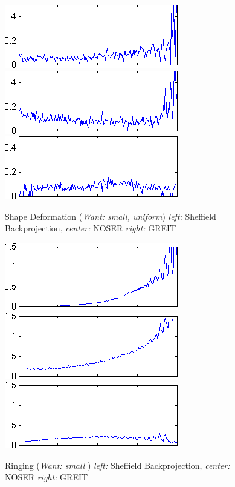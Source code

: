 \documentclass[12pt]{iopart}
\begin{document}
\begin{figure}[bhtp]
\begin{center}
  \includegraphics[width= 0.3 \textwidth]
{../../tutorial/GREIT-evaluation/simulation_test_imgs/simulation_test04_15.png}
  \includegraphics[width= 0.3 \textwidth]
{../../tutorial/GREIT-evaluation/simulation_test_imgs/simulation_test04_25.png}
  \includegraphics[width= 0.3 \textwidth]
{../../tutorial/GREIT-evaluation/simulation_test_imgs/simulation_test04_45.png}
\caption{ \label{fig:rimage}
Shape Deformation ({\em Want: small, uniform})
{\em left:} Sheffield Backprojection,
{\em center:} NOSER
{\em right:} GREIT
}
\end{center}
\end{figure}

\begin{figure}[bhtp]
\begin{center}
  \includegraphics[width= 0.3 \textwidth]
{../../tutorial/GREIT-evaluation/simulation_test_imgs/simulation_test04_16.png}
  \includegraphics[width= 0.3 \textwidth]
{../../tutorial/GREIT-evaluation/simulation_test_imgs/simulation_test04_26.png}
  \includegraphics[width= 0.3 \textwidth]
{../../tutorial/GREIT-evaluation/simulation_test_imgs/simulation_test04_46.png}
\caption{ \label{fig:rimage}
Ringing ({\em Want: small })
{\em left:} Sheffield Backprojection,
{\em center:} NOSER
{\em right:} GREIT
}
\end{center}
\end{figure}
\end{document}

